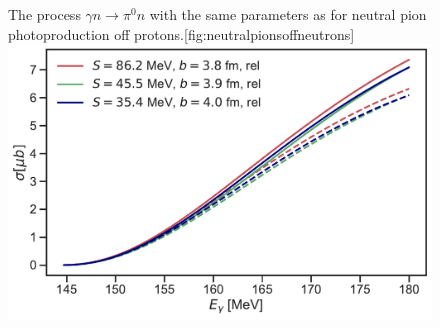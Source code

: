 \begin{figure}[H]
    \begin{sidecaption}{The process $\gamma n \rightarrow \pi^0 n$ with the same parameters as for neutral pion photoproduction off protons.}[fig:neutralpionsoffneutrons]
    \includegraphics[width=\linewidth]{Figures/NeutralPionsOffNeutrons.pdf}
    \end{sidecaption}
\end{figure}
